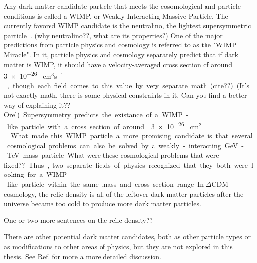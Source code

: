   
  Any dark matter candidate particle that meets the cosomological and particle conditions is called a WIMP, or Weakly Interacting Massive Particle.
  The currently favored WIMP candidate is the neutralino, the lightest supersymmetric particle~\cite{neutralino1}.
  {\color{red}(why neutralino??, what are its properties?)}
  One of the major predictions from particle physics and cosmology is referred to as the "WIMP Miracle".
  In it, particle physics and cosmology separately predict that if dark matter is WIMP, it should have a velocity-averaged cross section of around \SI{ 3e-26 }{ cm$ {}^3 $s$ {}^{-1} $ }, though each field comes to this value by very separate math. {\color{red}(cite??)}
  {\color{red}(It's not exactly math, there is some physical constraints in it. Can you find a better way of explaining it?? -Orel)}

  Supersymmetry predicts the existance of a WIMP-like particle with a cross section of around \nicetilde{} \SI{3e-26}{ cm${}^2$ }~\cite{Jungman:1995df}.
  What made this WIMP particle a more promising candidate is that several cosmological problems can also be solved by a weakly-interacting GeV-TeV mass particle.
  {\color{red}What were these cosmological problems that were fixed??}
  Thus, two separate fields of physics recognized that they both were looking for a WIMP-like particle within the same mass and cross section range.

  In $\Delta$CDM cosmology, the relic density is all of the leftover dark matter particles after the universe became too cold to produce more dark matter particles.

  {\color{red}One or two more sentences on the relic density??}

  There are other potential dark matter candidates, both as other particle types or as modifications to other areas of physics, but they are not explored in this thesis.
  See Ref. \cite{DMPrimer} for more a more detailed discussion.



